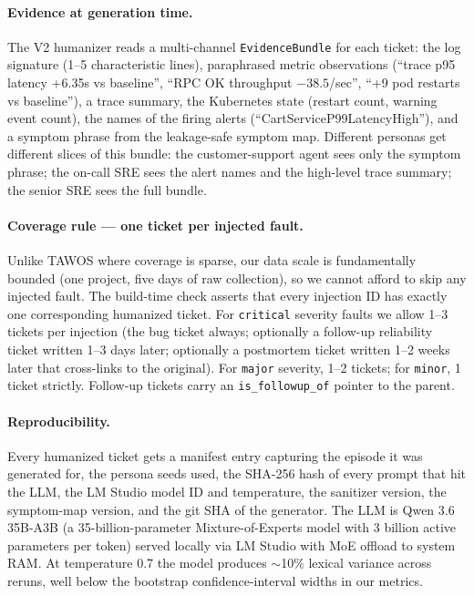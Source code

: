\paragraph{Evidence at generation time.} The V2 humanizer reads a multi-channel \texttt{EvidenceBundle} for each ticket: the log signature (1--5 characteristic lines), paraphrased metric observations (``trace p95 latency +6.35s vs baseline'', ``RPC OK throughput $-38.5$/sec'', ``+9 pod restarts vs baseline''), a trace summary, the Kubernetes state (restart count, warning event count), the names of the firing alerts (``CartServiceP99LatencyHigh''), and a symptom phrase from the leakage-safe symptom map. Different personas get different slices of this bundle: the customer-support agent sees only the symptom phrase; the on-call SRE sees the alert names and the high-level trace summary; the senior SRE sees the full bundle.

\paragraph{Coverage rule --- one ticket per injected fault.} Unlike TAWOS where coverage is sparse, our data scale is fundamentally bounded (one project, five days of raw collection), so we cannot afford to skip any injected fault. The build-time check asserts that every injection ID has exactly one corresponding humanized ticket. For \texttt{critical} severity faults we allow 1--3 tickets per injection (the bug ticket always; optionally a follow-up reliability ticket written 1--3 days later; optionally a postmortem ticket written 1--2 weeks later that cross-links to the original). For \texttt{major} severity, 1--2 tickets; for \texttt{minor}, 1 ticket strictly. Follow-up tickets carry an \texttt{is\_followup\_of} pointer to the parent.

\paragraph{Reproducibility.} Every humanized ticket gets a manifest entry capturing the episode it was generated for, the persona seeds used, the SHA-256 hash of every prompt that hit the LLM, the LM Studio model ID and temperature, the sanitizer version, the symptom-map version, and the git SHA of the generator. The LLM is Qwen 3.6 35B-A3B (a 35-billion-parameter Mixture-of-Experts model with 3 billion active parameters per token) served locally via LM Studio with MoE offload to system RAM. At temperature 0.7 the model produces $\sim$10\% lexical variance across reruns, well below the bootstrap confidence-interval widths in our metrics.

